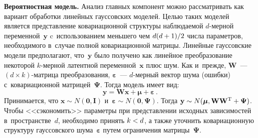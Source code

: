 \begin{multicols}{2}
     \textbf{Вероятностная модель.} Анализ главных компонент можно рассматривать как вариант 
обработки линейных гауссовских моделей. Целью таких моделей является 
пред\-став\-ле\-ние ковариационной структуры наблюдаемой $d$-мер\-ной 
переменной~$\mathbf{y}$ c~использованием меньшего чем $d(d\hm+1)/2$ 
чис\-ла па\-ра\-мет\-ров, необходимого в~случае полной ковариационной мат\-ри\-цы. 
Линейные гауссовские модели предполагают, что~$\mathbf{y}$ было получено 
как линейное преобразование некоторой $k$-мер\-ной латентной 
переменной~$\mathbf{x}$ плюс шум. Как и~прежде, $\mathbf{W}$~--- $(d\times 
k)$-мат\-ри\-ца преобразования, $\boldsymbol{\varepsilon}$~--- $d$-мер\-ный 
вектор шума (ошибки) с~ковариационной матрицей~$\boldsymbol{\Psi}$. Тогда 
модель имеет вид:
     \begin{equation}
     \mathbf{y}=\mathbf{W x}+{\boldsymbol {\mu}} 
+{\boldsymbol{\varepsilon}}\,.
     \label{e1-kri}
     \end{equation}
Принимается, что $\mathbf{x}\sim N(\mathbf{0}, \mathbf{I})$ 
и~${\boldsymbol{\varepsilon}}\sim N(\mathbf{0}, {\boldsymbol{\Psi}})$. Тогда 
$\mathbf{y}\sim N({\boldsymbol{\mu}}, \mathbf{W}\mathbf{W}^{\mathrm{T}} 
\hm+ {\boldsymbol{\Psi}})$. Чтобы <<сэкономить>> параметры при 
представлении исходных зависимостей в~пространстве~$d$, необходимо 
принять $k\hm<d$, а также уточнить ковариационную структуру гауссовского 
шума~$\boldsymbol{\varepsilon}$ путем ограничения 
матрицы~$\boldsymbol{\Psi}$.
     

\end{multicols}
